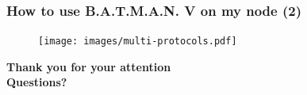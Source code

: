 \documentclass[slidestop]{beamer}
\begin{document}
\begin{frame}[c]
	\frametitle{How to use B.A.T.M.A.N. V on my node (2)}
	\begin{figure}
		\centering
		\texttt{[image: images/multi-protocols.pdf]}
	\end{figure}
\end{frame}

\begin{frame}[c]
	\begin{center}
	\Large{\textbf{Thank you for your attention\\[1cm]
	Questions?}}
	\end{center}
\end{frame}
\end{document}
